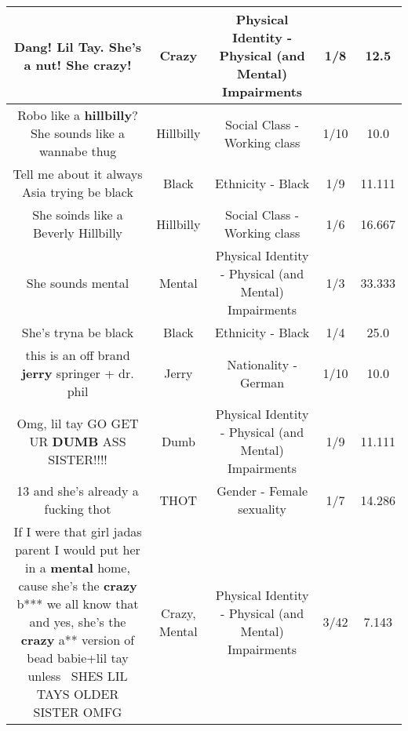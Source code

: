 \documentclass[11pt]{article}
\newlength\mylength
\begin{document}
\begin{center}
\begin{longtable}{|C{.65\mylength}|C{.30\mylength}|C{.12\mylength}|C{.12\mylength}|C{.12\mylength}|}
  \small Dang! Lil Tay. She's a nut! She \textbf{crazy}!\normalsize   & Crazy & Physical Identity - Physical (and Mental) Impairments & 1/8 & 12.5 \\  \hline
  \small Robo like a \textbf{hillbilly}? She sounds like a wannabe thug\normalsize   & Hillbilly & Social Class - Working class & 1/10 & 10.0 \\  \hline
  \small Tell me about it always Asia trying be black\normalsize   & Black & Ethnicity - Black & 1/9 & 11.111 \\  \hline
  \small She soinds like a Beverly Hillbilly\normalsize   & Hillbilly & Social Class - Working class & 1/6 & 16.667 \\  \hline
  \small She sounds mental\normalsize   & Mental & Physical Identity - Physical (and Mental) Impairments & 1/3 & 33.333 \\  \hline
  \small She's tryna be black\normalsize   & Black & Ethnicity - Black & 1/4 & 25.0 \\  \hline
  \small this is an off brand \textbf{jerry} springer + dr. phil\normalsize   & Jerry & Nationality - German & 1/10 & 10.0 \\  \hline
  \small Omg, lil tay GO GET UR \textbf{DUMB} ASS SISTER!!!!\normalsize   & Dumb & Physical Identity - Physical (and Mental) Impairments & 1/9 & 11.111 \\  \hline
  \small 13 and she's already a fucking thot\normalsize   & THOT & Gender - Female sexuality & 1/7 & 14.286 \\  \hline
  \small If I were that girl jadas parent I would put her in a \textbf{mental} home, cause she's the \textbf{crazy} b***  we all know that and yes, she's the \textbf{crazy} a** version of bead babie+lil tay unless~ SHES LIL TAYS OLDER SISTER OMFG\normalsize   & Crazy, Mental & Physical Identity - Physical (and Mental) Impairments & 3/42 & 7.143 \\  \hline

\end{longtable}
\end{center}
\end{document}
